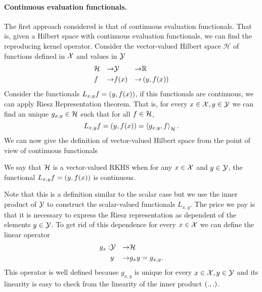 \paragraph*{Continuous evaluation functionals.}
The first approach considered is that of continuous evaluation functionals. That is, given a Hilbert space with continuous evaluation functionals, we can find the reproducing kernel operator.
Consider the vector-valued Hilbert space $\mathcal{H}$ of functions defined in $\mathcal{X}$ and values in $\mathcal{Y}$
\begin{equation*}
    \begin{aligned}
        &\mathcal{H} &\to &\mathcal{Y} &\to &\mathbb{R} \\
        &f &\to &f(x) &\to &\left( y, f(x) \right)
    \end{aligned}
\end{equation*}
Consider the functionals $L_{x, y} f = \left( y, f(x) \right)$, if this functionals are continuous, we can apply Riesz Representation theorem. That is, for every $x \in \mathcal{X}, y \in \mathcal{Y}$ we can find an unique $g_{x, y} \in \mathcal{H}$ such that for all $f \in \mathcal{H}$,
\begin{equation}\label{eq:vector_riesz}
    L_{x, y} f = \ydotp{y}{f(x)} = \dotp{g_{x,y}}{f}_{\hilbertspace} .
\end{equation}
We can now give the definition of vector-valued Hilbert space from the point of view of continuous functionals~\cite[Definition 2.1]{MicchelliP05}
\begin{definition}
    We say that $\mathcal{H}$ is a vector-valued RKHS when for any $x \in \mathcal{X}$ and $y \in \mathcal{Y}$, the functional $L_{x, y} f = \left( y, f(x) \right)$ is continuous.
\end{definition}
Note that this is a definition similar to the scalar case but we use the inner product of $\mathcal{Y}$ to construct the scalar-valued functionals $L_{x, y}$. The price we pay is that it is necessary to express the Riesz representation as dependent of the elements $y \in \mathcal{Y}$. To get rid of this dependence for every $x \in \mathcal{X}$ we can define the linear operator
\begin{equation*}
    \begin{aligned}
        g_x: &\mathcal{Y} &\to &\mathcal{H} \\
             & y      &\to &g_x y = g_{x, y}.
    \end{aligned}
\end{equation*}
This operator is well defined because $g_{x, y}$ is unique for every $x \in \mathcal{X}, y \in \mathcal{Y}$ and its linearity is easy to check from the linearity of the inner product $\left( ., . \right)$.\\

